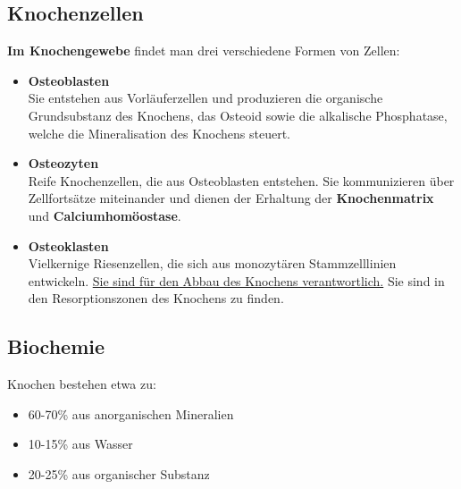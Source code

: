 \documentclass{article}
\begin{document}
\subsection{Knochenzellen}
\textbf{Im Knochengewebe} findet man drei verschiedene Formen von Zellen:
\begin{itemize}
    \item \textbf{Osteoblasten}\\
    Sie entstehen aus Vorläuferzellen und produzieren die organische Grundsubstanz des Knochens, das Osteoid sowie die alkalische Phosphatase, welche die Mineralisation des Knochens steuert.
    \item \textbf{Osteozyten}\\
    Reife Knochenzellen, die aus Osteoblasten entstehen. Sie kommunizieren über Zellfortsätze miteinander und dienen der Erhaltung der \textbf{Knochenmatrix} und \textbf{Calciumhomöostase}.  
    \item \textbf{Osteoklasten}\\
    Vielkernige Riesenzellen, die sich aus monozytären Stammzelllinien entwickeln. \underline{Sie sind für den Abbau des Knochens verantwortlich.} Sie sind in den Resorptionszonen des Knochens zu finden.
\end{itemize}
\subsection{Biochemie}
Knochen bestehen etwa zu:
\begin{itemize}
    \item 60-70\% aus anorganischen Mineralien
    \item 10-15\% aus Wasser
    \item 20-25\% aus organischer Substanz
\end{itemize}
\end{document}
